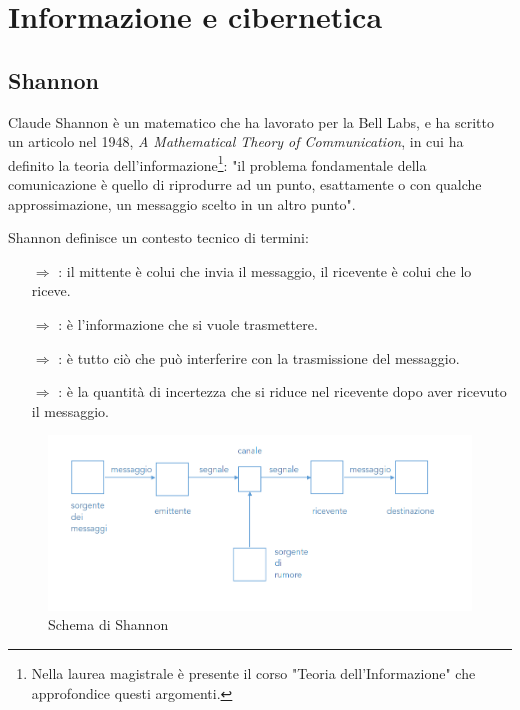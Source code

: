 \chapter{Informazione e cibernetica}

\section{Shannon}

Claude Shannon è un matematico che ha lavorato per la Bell Labs, e ha scritto un articolo nel 1948,
\textit{A Mathematical Theory of Communication}, in cui ha definito la teoria dell'informazione\footnote{Nella laurea magistrale è presente il corso "Teoria dell'Informazione" che approfondice questi argomenti.}: 
"il problema fondamentale della comunicazione è quello di 
riprodurre ad un punto, esattamente o con qualche approssimazione, un messaggio
scelto in un altro punto".

Shannon definisce un contesto tecnico di termini:
\begin{itemize}
    \item [$\Rightarrow$] : il mittente è colui che invia il messaggio, il ricevente è colui che lo riceve.
    \item [$\Rightarrow$] : è l'informazione che si vuole trasmettere.
    \item [$\Rightarrow$] : è tutto ciò che può interferire con la trasmissione del messaggio.
    \item [$\Rightarrow$] : è la quantità di incertezza che si riduce nel ricevente dopo aver ricevuto il messaggio.
\end{itemize}



\begin{figure}[h]
    \centering
    \includegraphics[scale=0.35]{images/Shannon.png}
    \caption{Schema di Shannon}
\end{figure}

